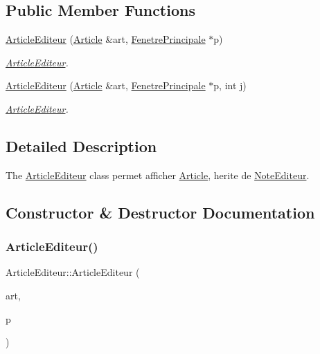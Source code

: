 \subsection*{Public Member Functions}
\begin{DoxyCompactItemize}
\item 
\hyperlink{class_article_editeur_a5dd5b7ad1e2076e432deeb40817c4b19}{Article\+Editeur} (\hyperlink{class_article}{Article} \&art, \hyperlink{class_fenetre_principale}{Fenetre\+Principale} $\ast$p)
\begin{DoxyCompactList}\small\item\em \hyperlink{class_article_editeur}{Article\+Editeur}. \end{DoxyCompactList}\item 
\hyperlink{class_article_editeur_ad83c4235eddf80bcd2be5bd80d49a06a}{Article\+Editeur} (\hyperlink{class_article}{Article} \&art, \hyperlink{class_fenetre_principale}{Fenetre\+Principale} $\ast$p, int j)
\begin{DoxyCompactList}\small\item\em \hyperlink{class_article_editeur}{Article\+Editeur}. \end{DoxyCompactList}\end{DoxyCompactItemize}


\subsection{Detailed Description}
The \hyperlink{class_article_editeur}{Article\+Editeur} class permet afficher \hyperlink{class_article}{Article}, herite de \hyperlink{class_note_editeur}{Note\+Editeur}. 

\subsection{Constructor \& Destructor Documentation}
\mbox{\label{class_article_editeur_a5dd5b7ad1e2076e432deeb40817c4b19}} 
\subsubsection{\texorpdfstring{Article\+Editeur()}{ArticleEditeur()}\hspace{0.1cm}{\footnotesize\ttfamily [1/2]}}
{\footnotesize\ttfamily Article\+Editeur\+::\+Article\+Editeur (\begin{DoxyParamCaption}\item[{\hyperlink{class_article}{Article} \&}]{art,  }\item[{\hyperlink{class_fenetre_principale}{Fenetre\+Principale} $\ast$}]{p }\end{DoxyParamCaption})}



